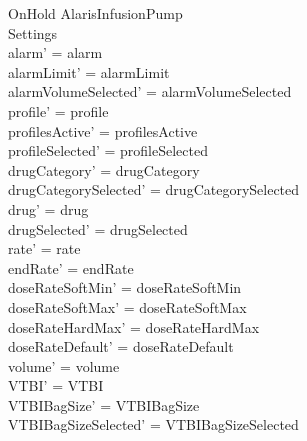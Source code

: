 \begin{schema}{OnHold}
	\Delta AlarisInfusionPump\\
	Settings\\
	\where
	alarm' = alarm\\
	alarmLimit' = alarmLimit\\
	alarmVolumeSelected' = alarmVolumeSelected\\
	profile' = profile\\
	profilesActive' = profilesActive\\  
	  profileSelected' = profileSelected\\
	drugCategory' = drugCategory\\ drugCategorySelected' = drugCategorySelected\\
	drug' = drug\\ drugSelected' = drugSelected\\
	rate' = rate\\
	endRate' = endRate\\
	doseRateSoftMin' = doseRateSoftMin\\
	doseRateSoftMax' = doseRateSoftMax\\
	doseRateHardMax' = doseRateHardMax\\
	doseRateDefault' = doseRateDefault\\
	volume' = volume\\
	VTBI' = VTBI\\
	VTBIBagSize' = VTBIBagSize\\ VTBIBagSizeSelected' = VTBIBagSizeSelected\\

\end{schema}
